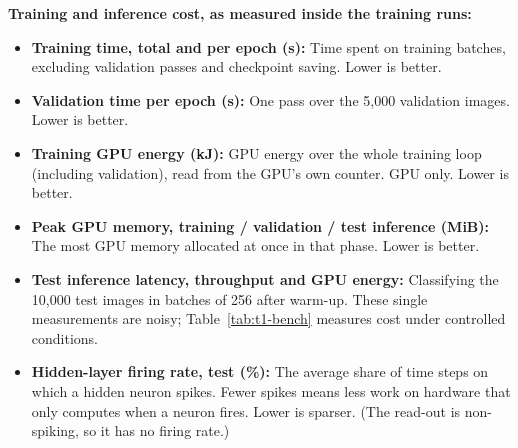 \documentclass{article}
\begin{document}
{\small
\noindent\textbf{Training and inference cost, as measured inside the training runs:}
\begin{itemize}
  \item \textbf{Training time, total and per epoch (s):} Time spent on training batches, excluding validation
    passes and checkpoint saving. Lower is better.
  \item \textbf{Validation time per epoch (s):} One pass over the 5,000 validation images. Lower is better.
  \item \textbf{Training GPU energy (kJ):} GPU energy over the whole training loop (including validation), read
    from the GPU's own counter. GPU only. Lower is better.
  \item \textbf{Peak GPU memory, training / validation / test inference (MiB):} The most GPU memory allocated at
    once in that phase. Lower is better.
  \item \textbf{Test inference latency, throughput and GPU energy:} Classifying the 10,000 test images in batches
    of 256 after warm-up. These single measurements are noisy; Table~\ref{tab:t1-bench} measures cost under
    controlled conditions.
  \item \textbf{Hidden-layer firing rate, test (\%):} The average share of time steps on which a hidden neuron
    spikes. Fewer spikes means less work on hardware that only computes when a neuron fires. Lower is sparser.
    (The read-out is non-spiking, so it has no firing rate.)
\end{itemize}
}
\end{document}
